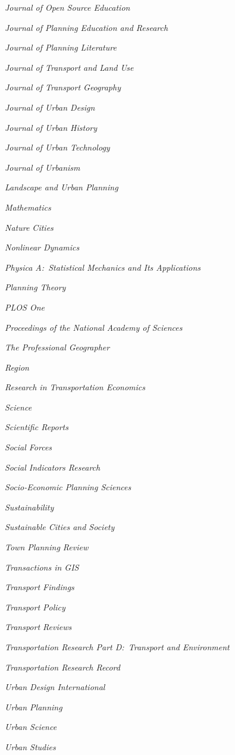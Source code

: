 \documentclass[11pt,letterpaper]{report} %
\newcommand{\listitemspace}{0.25em}
\renewenvironment{itemize}
{
  \begin{list}{}{\setlength{\leftmargin}{0em}
      \setlength{\parskip}{0em}
      \setlength{\itemsep}{\listitemspace}
  \setlength{\parsep}{\listitemspace}}}
  {
\end{list}}
\begin{document}
\begin{itemize}
  \item \textit{Journal of Open Source Education}
  \item \textit{Journal of Planning Education and Research}
  \item \textit{Journal of Planning Literature}
  \item \textit{Journal of Transport and Land Use}
  \item \textit{Journal of Transport Geography}
  \item \textit{Journal of Urban Design}
  \item \textit{Journal of Urban History}
  \item \textit{Journal of Urban Technology}
  \item \textit{Journal of Urbanism}
  \item \textit{Landscape and Urban Planning}
  \item \textit{Mathematics}
  \item \textit{Nature Cities}
  \item \textit{Nonlinear Dynamics}
  \item \textit{Physica A:\ Statistical Mechanics and Its Applications}
  \item \textit{Planning Theory}
  \item \textit{PLOS One}
  \item \textit{Proceedings of the National Academy of Sciences}
  \item \textit{The Professional Geographer}
  \item \textit{Region}
  \item \textit{Research in Transportation Economics}
  \item \textit{Science}
  \item \textit{Scientific Reports}
  \item \textit{Social Forces}
  \item \textit{Social Indicators Research}
  \item \textit{Socio-Economic Planning Sciences}
  \item \textit{Sustainability}
  \item \textit{Sustainable Cities and Society}
  \item \textit{Town Planning Review}
  \item \textit{Transactions in GIS}
  \item \textit{Transport Findings}
  \item \textit{Transport Policy}
  \item \textit{Transport Reviews}
  \item \textit{Transportation Research Part D:\ Transport and Environment}
  \item \textit{Transportation Research Record}
  \item \textit{Urban Design International}
  \item \textit{Urban Planning}
  \item \textit{Urban Science}
  \item \textit{Urban Studies}

\end{itemize}
\end{document}
